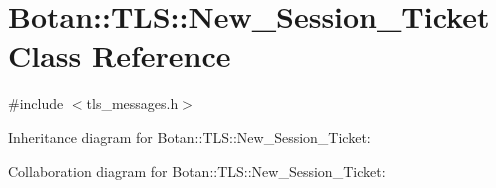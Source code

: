 \hypertarget{class_botan_1_1_t_l_s_1_1_new___session___ticket}{}\section{Botan\+:\+:T\+LS\+:\+:New\+\_\+\+Session\+\_\+\+Ticket Class Reference}
\label{class_botan_1_1_t_l_s_1_1_new___session___ticket}


{\ttfamily \#include $<$tls\+\_\+messages.\+h$>$}



Inheritance diagram for Botan\+:\+:T\+LS\+:\+:New\+\_\+\+Session\+\_\+\+Ticket\+:


Collaboration diagram for Botan\+:\+:T\+LS\+:\+:New\+\_\+\+Session\+\_\+\+Ticket\+:
